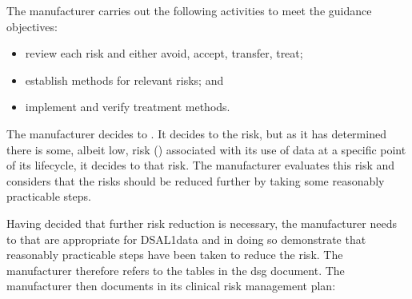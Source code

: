 \begin{minipage}[t]{0.73\textwidth}
  The manufacturer carries out the following activities to meet the guidance objectives:
  \begin{itemize}
    \item review each risk and either avoid, accept, transfer, treat;
    \item establish  methods for relevant risks; and
    \item implement and verify \gls{treatment} methods.
  \end{itemize}
\end{minipage}
\begin{minipage}[t]{0.25\textwidth}
  \centering{}
\end{minipage}

The manufacturer decides to . It decides to  the  risk, but as it has determined there is some, albeit low, risk () associated with its use of data at a specific point of its lifecycle, it decides to  that risk. The manufacturer evaluates this risk and considers that the risks should be reduced further by taking some reasonably practicable steps.

Having decided that further risk reduction is necessary, the manufacturer needs to  that are appropriate for DSAL1data and in doing so demonstrate that reasonably practicable steps have been taken to reduce the risk. The manufacturer therefore refers to the tables in the \gls{dsg} document. The manufacturer then documents in its clinical risk management plan:

